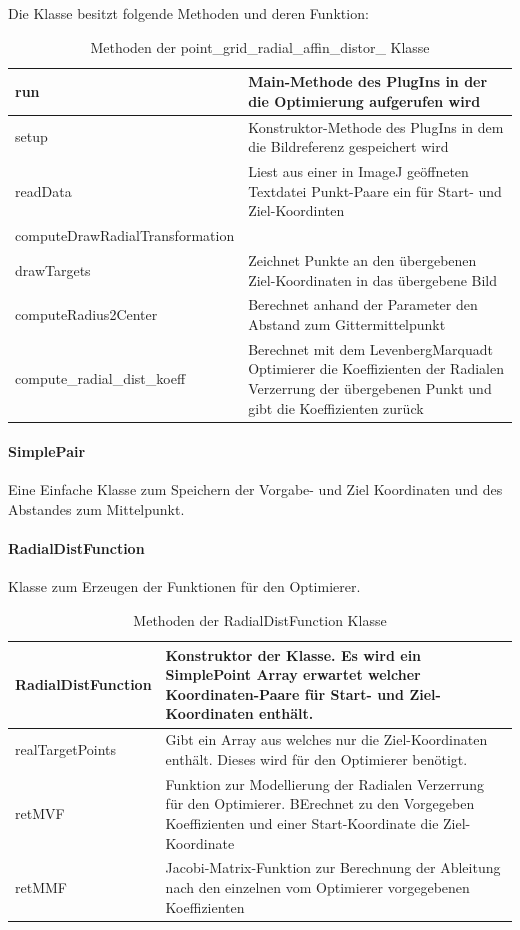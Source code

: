 Die Klasse besitzt folgende Methoden und deren Funktion:

\begin{table}[H]
	\begin{tabular}{|p{} | p{}|} 
		\hline
		run & Main-Methode des PlugIns in der die Optimierung aufgerufen wird\\ \hline
		setup & Konstruktor-Methode des PlugIns in dem die Bildreferenz gespeichert wird\\ \hline
		readData & Liest aus einer in ImageJ geöffneten Textdatei Punkt-Paare ein für Start- und Ziel-Koordinten\\\hline
		computeDrawRadialTransformation & \\ \hline
		drawTargets & Zeichnet Punkte an den übergebenen Ziel-Koordinaten in das übergebene Bild\\ \hline
		computeRadius2Center & Berechnet anhand der Parameter den Abstand zum Gittermittelpunkt\\ \hline
		compute\_radial\_dist\_koeff & Berechnet mit dem LevenbergMarquadt Optimierer die Koeffizienten der Radialen Verzerrung der übergebenen Punkt und gibt die Koeffizienten zurück\\ 
		\hline
	\end{tabular}
	\caption{Methoden der point\_grid\_radial\_affin\_distor\_ Klasse}
\end{table}

\paragraph{SimplePair}
Eine Einfache Klasse zum Speichern der Vorgabe- und Ziel Koordinaten und des Abstandes zum Mittelpunkt.

\paragraph{RadialDistFunction}
Klasse zum Erzeugen der Funktionen für den Optimierer.

\begin{table}[H]
	\begin{tabular}{|p{} | p{}|} 
		\hline
		RadialDistFunction & Konstruktor der Klasse. Es wird ein SimplePoint Array erwartet welcher Koordinaten-Paare für Start- und Ziel-Koordinaten enthält.\\ \hline
		realTargetPoints & Gibt ein Array aus welches nur die Ziel-Koordinaten enthält. Dieses wird für den Optimierer benötigt.\\ \hline
		retMVF & Funktion zur Modellierung der Radialen Verzerrung für den Optimierer. BErechnet zu den Vorgegeben Koeffizienten und einer Start-Koordinate die Ziel-Koordinate\\ \hline
		retMMF & Jacobi-Matrix-Funktion zur Berechnung der Ableitung nach den einzelnen vom Optimierer vorgegebenen Koeffizienten \\ 
		\hline
	\end{tabular}
	\caption{Methoden der RadialDistFunction Klasse}
\end{table}

